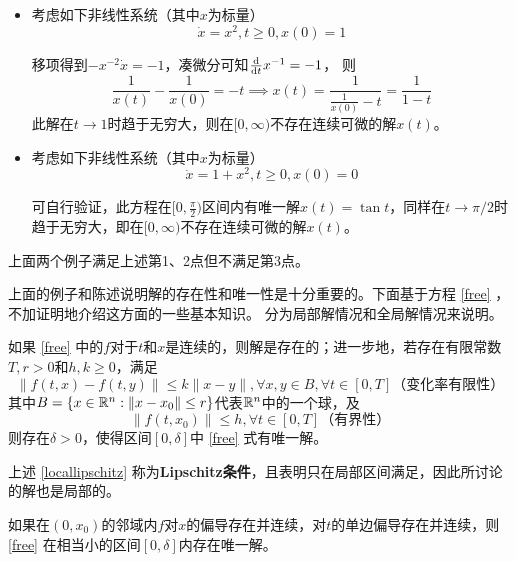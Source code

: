 \begin{example}[时间半轴$[0,\infty)$上不存在解] 
  \begin{itemize}[leftmargin=1em]
    \item 考虑如下非线性系统（其中$x$为标量）
    \begin{equation*}
      \dot{x}=x^2,t\ge 0,x(0)=1
    \end{equation*}

    移项得到$-x^{-2}\dot{x}=-1$，凑微分可知$\frac{\mathop{}\!\mathrm{d}}{\mathop{}\!\mathrm{d} t}x^{-1}=-1$，
    则\[\frac{1}{x(t)}-\frac{1}{x(0)}=-t\implies x(t)=\frac{1}{\frac{1}{x(0)}-t}=\frac{1}{1-t}\]
    此解在$t\to 1$时趋于无穷大，则在$[0,\infty)$不存在连续可微的解$x(t)$。
    \item 考虑如下非线性系统（其中$x$为标量）
    \begin{equation*}
      \dot{x}=1+x^{2},t\ge 0,x(0)=0
    \end{equation*}
  
    可自行验证，此方程在$[0,\frac{\pi}{2})$区间内有唯一解$x(t)=\tan t$，同样在$t\to \pi/2$时趋于无穷大，即在$[0,\infty)$不存在连续可微的解$x(t)$。
  \end{itemize}

  上面两个例子满足上述第1、2点但不满足第3点。
\end{example}

上面的例子和陈述说明解的存在性和唯一性是十分重要的。下面基于方程 \eqref{free} ，不加证明地介绍这方面的一些基本知识。
分为局部解情况和全局解情况来说明。
\begin{theorem}[局部唯一解条件]
如果 \eqref{free} 中的$f$对于$t$和$x$是连续的，则解是存在的；进一步地，若存在有限常数$T,r>0$和$h,k\ge0$，满足
\begin{equation}\label{locallipschitz}
  \|f(t,x)-f(t,y)\|\le k\|x-y\|,\forall x,y\in B,\forall t\in [0,T]\text{（变化率有限性）}
\end{equation}
其中$B=\{x\in\mathbb{R}{}^n:\|x-x_0\|\le r\}$代表$\mathbb{R}{}^n$中的一个球，及
\begin{equation}
  \|f(t,x_0)\|\le h,\forall t\in [0,T]\text{（有界性）}
\end{equation}
则存在$\delta>0$，使得区间$[0,\delta]$中 \eqref{free} 式有唯一解。
\end{theorem}
上述 \eqref{locallipschitz} 称为{\bf Lipschitz条件}，且表明只在局部区间满足，因此所讨论的解也是局部的。
\begin{corollary}
  如果在$(0,x_0)$的邻域内$f$对$x$的偏导存在并连续，对$t$的单边偏导存在并连续，则 \eqref{free} 在相当小的区间$[0,\delta]$内存在唯一解。
\end{corollary}


